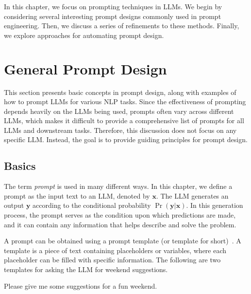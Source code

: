 In this chapter, we focus on prompting techniques in LLMs. We begin by considering several interesting prompt designs commonly used in prompt engineering. Then, we discuss a series of refinements to these methods. Finally, we explore approaches for automating prompt design.

\vspace{0.5em}



\section{General Prompt Design}

\noindent This section presents basic concepts in prompt design, along with examples of how to prompt LLMs for various NLP tasks. Since the effectiveness of prompting depends heavily on the LLMs being used, prompts often vary across different LLMs, which makes it difficult to provide a comprehensive list of prompts for all LLMs and downstream tasks. Therefore, this discussion does not focus on any specific LLM. Instead, the goal is to provide guiding principles for prompt design.

\subsection{Basics}

\noindent The term \textit{prompt} is used in many different ways. In this chapter, we define a prompt as the input text to an LLM, denoted by $\mathbf{x}$. The LLM generates an output $\mathbf{y}$ according to the conditional probability $\Pr(\mathbf{y}|\mathbf{x})$. In this generation process, the prompt serves as the condition upon which predictions are made, and it can contain any information that helps describe and solve the problem.

A prompt can be obtained using a prompt template (or template for short)~\cite{liu-etal:2023pre}. A template is a piece of text containing placeholders or variables, where each placeholder can be filled with specific information. The following are two templates for asking the LLM for weekend suggestions.

\vspace{0.5em}
\begin{tcolorbox}

\hspace{2em} Please give me some suggestions for a fun weekend.

\hspace{2em} \underline{\hspace{2em}}
\end{tcolorbox}
\vspace{0.5em}

